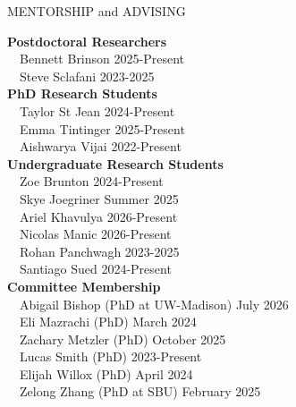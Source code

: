\documentclass{resume} %
\begin{document}
\begin{rSection}{MENTORSHIP and ADVISING}

  \textbf{Postdoctoral Researchers} \\
  \-\ \-\ Bennett Brinson \hfill 2025-Present \\
  \-\ \-\ Steve Sclafani \hfill 2023-2025 \\
  \textbf{PhD Research Students} \\
  \-\ \-\ Taylor St Jean \hfill 2024-Present \\
   \-\ \-\ Emma Tintinger \hfill 2025-Present \\
  \-\ \-\ Aishwarya Vijai \hfill 2022-Present \\
  \textbf{Undergraduate Research Students} \\
  \-\ \-\ Zoe Brunton \hfill 2024-Present \\
  \-\ \-\ Skye Joegriner \hfill Summer 2025 \\
  \-\ \-\ Ariel Khavulya \hfill 2026-Present \\
    \-\ \-\ Nicolas Manic \hfill 2026-Present \\
  \-\ \-\ Rohan Panchwagh \hfill 2023-2025 \\
   \-\ \-\ Santiago Sued \hfill 2024-Present \\
  \textbf{Committee Membership} \\
    \-\ \-\ Abigail Bishop (PhD at UW-Madison) \hfill July 2026 \\
  \-\ \-\ Eli Mazrachi (PhD) \hfill March 2024 \\
  \-\ \-\ Zachary Metzler (PhD) \hfill October 2025 \\
  \-\ \-\ Lucas Smith (PhD) \hfill 2023-Present \\
  \-\ \-\ Elijah Willox (PhD) \hfill April 2024 \\
  \-\ \-\ Zelong Zhang (PhD at SBU) \hfill February 2025 \\

\end{rSection}

\newpage
\end{document}
